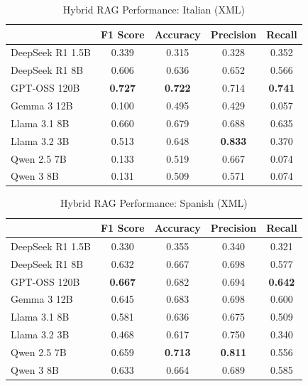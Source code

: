 \begin{table}[!htbp]
\caption{Hybrid RAG Performance: Italian (XML)}
\label{tab:hybrid_italian_xml}
\begin{tabular}{lcccc}
\toprule
 & F1 Score & Accuracy & Precision & Recall \\
\midrule
DeepSeek R1 1.5B & 0.339 & 0.315 & 0.328 & 0.352 \\
DeepSeek R1 8B & 0.606 & 0.636 & 0.652 & 0.566 \\
GPT-OSS 120B & \textbf{0.727} & \textbf{0.722} & 0.714 & \textbf{0.741} \\
Gemma 3 12B & 0.100 & 0.495 & 0.429 & 0.057 \\
Llama 3.1 8B & 0.660 & 0.679 & 0.688 & 0.635 \\
Llama 3.2 3B & 0.513 & 0.648 & \textbf{0.833} & 0.370 \\
Qwen 2.5 7B & 0.133 & 0.519 & 0.667 & 0.074 \\
Qwen 3 8B & 0.131 & 0.509 & 0.571 & 0.074 \\
\bottomrule
\end{tabular}
\end{table}


\begin{table}[!htbp]
\caption{Hybrid RAG Performance: Spanish (XML)}
\label{tab:hybrid_spanish_xml}
\begin{tabular}{lcccc}
\toprule
 & F1 Score & Accuracy & Precision & Recall \\
\midrule
DeepSeek R1 1.5B & 0.330 & 0.355 & 0.340 & 0.321 \\
DeepSeek R1 8B & 0.632 & 0.667 & 0.698 & 0.577 \\
GPT-OSS 120B & \textbf{0.667} & 0.682 & 0.694 & \textbf{0.642} \\
Gemma 3 12B & 0.645 & 0.683 & 0.698 & 0.600 \\
Llama 3.1 8B & 0.581 & 0.636 & 0.675 & 0.509 \\
Llama 3.2 3B & 0.468 & 0.617 & 0.750 & 0.340 \\
Qwen 2.5 7B & 0.659 & \textbf{0.713} & \textbf{0.811} & 0.556 \\
Qwen 3 8B & 0.633 & 0.664 & 0.689 & 0.585 \\
\bottomrule
\end{tabular}
\end{table}
